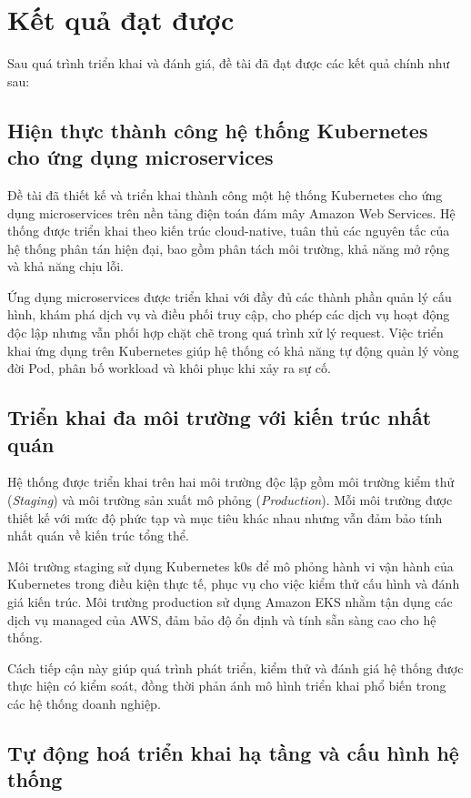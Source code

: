 \section{Kết quả đạt được}
\label{sec:chap3-results}

Sau quá trình triển khai và đánh giá, đề tài đã đạt được các kết quả chính như sau:

\subsection{Hiện thực thành công hệ thống Kubernetes cho ứng dụng microservices}

Đề tài đã thiết kế và triển khai thành công một hệ thống Kubernetes cho ứng dụng
microservices trên nền tảng điện toán đám mây Amazon Web Services. Hệ thống được
triển khai theo kiến trúc cloud-native, tuân thủ các nguyên tắc của hệ thống phân
tán hiện đại, bao gồm phân tách môi trường, khả năng mở rộng và khả năng chịu lỗi.

Ứng dụng microservices được triển khai với đầy đủ các thành phần quản lý cấu hình,
khám phá dịch vụ và điều phối truy cập, cho phép các dịch vụ hoạt động độc lập nhưng
vẫn phối hợp chặt chẽ trong quá trình xử lý request. Việc triển khai ứng dụng trên
Kubernetes giúp hệ thống có khả năng tự động quản lý vòng đời Pod, phân bố workload
và khôi phục khi xảy ra sự cố.

\subsection{Triển khai đa môi trường với kiến trúc nhất quán}

Hệ thống được triển khai trên hai môi trường độc lập gồm môi trường kiểm thử
(\textit{Staging}) và môi trường sản xuất mô phỏng (\textit{Production}). Mỗi môi
trường được thiết kế với mức độ phức tạp và mục tiêu khác nhau nhưng vẫn đảm bảo
tính nhất quán về kiến trúc tổng thể.

Môi trường staging sử dụng Kubernetes k0s để mô phỏng hành vi vận hành của Kubernetes
trong điều kiện thực tế, phục vụ cho việc kiểm thử cấu hình và đánh giá kiến trúc.
Môi trường production sử dụng Amazon EKS nhằm tận dụng các dịch vụ managed của AWS,
đảm bảo độ ổn định và tính sẵn sàng cao cho hệ thống.

Cách tiếp cận này giúp quá trình phát triển, kiểm thử và đánh giá hệ thống được thực
hiện có kiểm soát, đồng thời phản ánh mô hình triển khai phổ biến trong các hệ thống
doanh nghiệp.

\subsection{Tự động hoá triển khai hạ tầng và cấu hình hệ thống}

